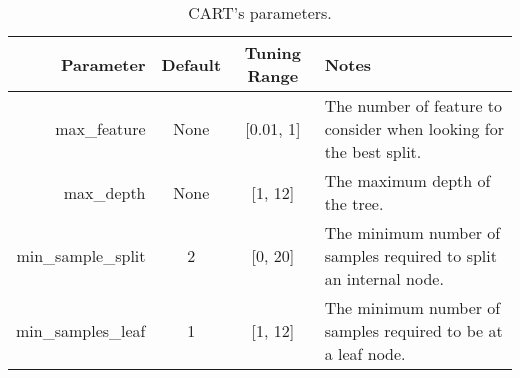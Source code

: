 \begin{table*}[!t]
\centering
\caption{CART's parameters.}\label{tbl:cart}
\begin{tabular}{r|c|c|p{3.2in}}
Parameter          & Default & Tuning Range  & Notes                                                            \\\hline
max\_feature       & None    & {[}0.01, 1{]} & The number of feature to consider when looking for the best split. \\\hline 
max\_depth         & None    & {[}1, 12{]}   & The maximum depth of the tree.                                     \\\hline 
min\_sample\_split & 2       & {[}0, 20{]}   & The minimum number of samples required to split an internal node.  \\\hline 
min\_samples\_leaf & 1       & {[}1, 12{]}   & The minimum number of samples required to be at a leaf node.      
\end{tabular}
\end{table*}